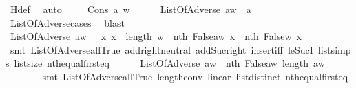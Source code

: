 \begin{isabellebody}
\ H{\isacharunderscore}def\ \isamarkupfalse%
\ auto\ \isanewline
{}\isamarkupfalse%
\isanewline
\ \ \isamarkupfalse%
\ {\isacharparenleft}Cons\ a\ w{\isacharparenright}\isanewline
\ \ \ \ \isamarkupfalse%
\ {\isachardoublequoteopen}ListOfAdverse\ {\isacharparenleft}a{\isacharhash}w{\isacharparenright}\ {\isasymlongrightarrow}\ a{\isachardoublequoteclose}\isanewline
\ \ \ \ \ \ \isamarkupfalse%
\ ListOfAdverse{\isachardot}cases\ \isamarkupfalse%
\ blast\isanewline
\ \ \ \ \isamarkupfalse%
\ \isamarkupfalse%
\ {\isachardoublequoteopen}ListOfAdverse\ {\isacharparenleft}a{\isacharhash}w{\isacharparenright}\ {\isasymlongrightarrow}\ {\isacharparenleft}{\isasymforall}\ x{\isachardot}\ x\ {\isasymle}\ length\ w\ {\isasymlongrightarrow}\ nth\ {\isacharparenleft}False{\isacharhash}{\isacharparenleft}a{\isacharhash}w{\isacharparenright}{\isacharparenright}\ x\ {\isacharequal}\ nth\ {\isacharparenleft}False{\isacharhash}w{\isacharparenright}\ x{\isacharparenright}{\isachardoublequoteclose}\isanewline
\ \ \ \ \ \ \isamarkupfalse%
\ {\isacharparenleft}smt\ ListOfAdverse{\isacharunderscore}all{\isacharunderscore}True\ add{\isachardot}right{\isacharunderscore}neutral\ add{\isacharunderscore}Suc{\isacharunderscore}right\ insert{\isacharunderscore}iff\ le{\isacharunderscore}SucI\ list{\isachardot}simps{\isacharparenleft}{}{}{\isacharparenright}\ list{\isachardot}size{\isacharparenleft}{}{\isacharparenright}\ nth{\isacharunderscore}equal{\isacharunderscore}first{\isacharunderscore}eq{\isacharparenright}\isanewline
\ \ \ \ \isamarkupfalse%
\ {\isachardoublequoteopen}ListOfAdverse\ {\isacharparenleft}a{\isacharhash}w{\isacharparenright}\ {\isasymlongrightarrow}\ {\isacharparenleft}nth\ {\isacharparenleft}False{\isacharhash}{\isacharparenleft}a{\isacharhash}w{\isacharparenright}{\isacharparenright}\ {\isacharparenleft}length\ {\isacharparenleft}a{\isacharhash}w{\isacharparenright}{\isacharparenright}{\isacharparenright}{\isachardoublequoteclose}\isanewline
\ \ \ \ \ \ \isamarkupfalse%
\ {\isacharparenleft}smt\ ListOfAdverse{\isacharunderscore}all{\isacharunderscore}True\ length{\isacharunderscore}{}{\isacharunderscore}conv\ linear\ list{\isachardot}distinct{\isacharparenleft}{}{\isacharparenright}\ nth{\isacharunderscore}equal{\isacharunderscore}first{\isacharunderscore}eq{\isacharparenright}\isanewline
\ \ \isamarkupfalse%

\end{isabellebody}
